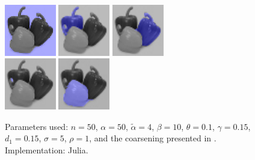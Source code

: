 \documentclass[12pt]{article}%
\begin{document}
\begin{figure}[ht]
\centering
\includegraphics[width=0.2\textwidth,height=0.2\textwidth]{peppers_seg_1.png} \hspace{.45cm}
\includegraphics[width=0.2\textwidth,height=0.2\textwidth]{peppers_seg_2.png} \hspace{.45cm}
\includegraphics[width=0.2\textwidth,height=0.2\textwidth]{peppers_seg_3.png} \\ \vspace{.45cm}
\includegraphics[width=0.2\textwidth,height=0.2\textwidth]{peppers_seg_4.png} \hspace{.45cm}
\includegraphics[width=0.2\textwidth,height=0.2\textwidth]{peppers_seg_5.png}
\caption{Parameters used: $n = 50$, $\alpha = 50$, $\tilde{\alpha} = 4$, $\beta = 10$, $\theta = 0.1$, $\gamma = 0.15$, $d_1 = 0.15$, $\sigma = 5$, $\rho = 1$, and the coarsening presented in \cite{inglis:2010}.  Implementation: Julia.}
\label{fig:peppers}
\end{figure}
\end{document}
